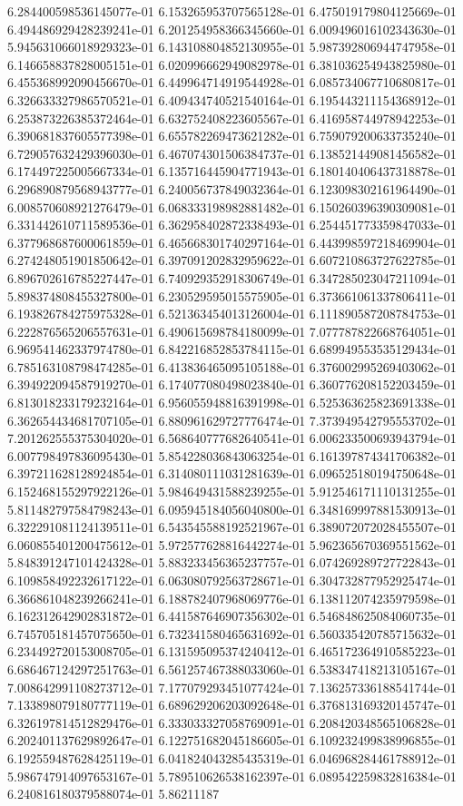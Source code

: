 	6.284400598536145077e-01	6.153265953707565128e-01	6.475019179804125669e-01	6.494486929428239241e-01	6.201254958366345660e-01	6.009496016102343630e-01	5.945631066018929323e-01	6.143108804852130955e-01	5.987392806944747958e-01	6.146658837828005151e-01	6.020996662949082978e-01	6.381036254943825980e-01	6.455368992090456670e-01	6.449964714919544928e-01	6.085734067710680817e-01	6.326633327986570521e-01	6.409434740521540164e-01	6.195443211154368912e-01	6.253873226385372464e-01	6.632752408223605567e-01	6.416958744978942253e-01	6.390681837605577398e-01	6.655782269473621282e-01	6.759079200633735240e-01	6.729057632429396030e-01	6.467074301506384737e-01	6.138521449081456582e-01	6.174497225005667334e-01	6.135716445904771943e-01	6.180140406437318878e-01	6.296890879568943777e-01	6.240056737849032364e-01	6.123098302161964490e-01	6.008570608921276479e-01	6.068333198982881482e-01	6.150260396390309081e-01	6.331442610711589536e-01	6.362958402872338493e-01	6.254451773359847033e-01	6.377968687600061859e-01	6.465668301740297164e-01	6.443998597218469904e-01	6.274248051901850642e-01	6.397091202832959622e-01	6.607210863727622785e-01	6.896702616785227447e-01	6.740929352918306749e-01	6.347285023047211094e-01	5.898374808455327800e-01	6.230529595015575905e-01	6.373661061337806411e-01	6.193826784275975328e-01	6.521363454013126004e-01	6.111890587208784753e-01	6.222876565206557631e-01	6.490615698784180099e-01	7.077787822668764051e-01	6.969541462337974780e-01	6.842216852853784115e-01	6.689949553535129434e-01	6.785163108798474285e-01	6.413836465095105188e-01	6.376002995269403062e-01	6.394922094587919270e-01	6.174077080498023840e-01	6.360776208152203459e-01	6.813018233179232164e-01	6.956055948816391998e-01	6.525363625823691338e-01	6.362654434681707105e-01	6.880961629727776474e-01	7.373949542795553702e-01	7.201262555375304020e-01	6.568640777682640541e-01	6.006233500693943794e-01	6.007798497836095430e-01	5.854228036843063254e-01	6.161397874341706382e-01	6.397211628128924854e-01	6.314080111031281639e-01	6.096525180194750648e-01	6.152468155297922126e-01	5.984649431588239255e-01	5.912546171110131255e-01	5.811482797584798243e-01	6.095945184056040800e-01	6.348169997881530913e-01	6.322291081124139511e-01	6.543545588192521967e-01	6.389072072028455507e-01	6.060855401200475612e-01	5.972577628816442274e-01	5.962365670369551562e-01	5.848391247101424328e-01	5.883233456365237757e-01	6.074269289727722843e-01	6.109858492232617122e-01	6.063080792563728671e-01	6.304732877952925474e-01	6.366861048239266241e-01	6.188782407968069776e-01	6.138112074235979598e-01	6.162312642902831872e-01	6.441587646907356302e-01	6.546848625084060735e-01	6.745705181457075650e-01	6.732341580465631692e-01	6.560335420785715632e-01	6.234492720153008705e-01	6.131595095374240412e-01	6.465172364910585223e-01	6.686467124297251763e-01	6.561257467388033060e-01	6.538347418213105167e-01	7.008642991108273712e-01	7.177079293451077424e-01	7.136257336188541744e-01	7.133898079180777119e-01	6.689629206203092648e-01	6.376813169320145747e-01	6.326197814512829476e-01	6.333033327058769091e-01	6.208420348565106828e-01	6.202401137629892647e-01	6.122751682045186605e-01	6.109232499838996855e-01	6.192559487628425119e-01	6.041824043285435319e-01	6.046968284461788912e-01	5.986747914097653167e-01	5.789510626538162397e-01	6.089542259832816384e-01	6.240816180379588074e-01	5.86211187